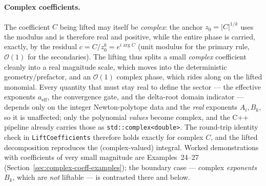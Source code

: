 \documentclass[11pt,a4paper]{article}
\begin{document}
\paragraph{Complex coefficients.} The coefficient $C$ being lifted may itself be \emph{complex}: the anchor $z_0 = |C|^{1/k}$ uses the modulus and is therefore real and positive, while the entire phase is carried, exactly, by the residual $c = C/z_0^{k} = e^{i\arg C}$ (unit modulus for the primary rule, $\mathcal{O}(1)$ for the secondaries). The lifting thus splits a small \emph{complex} coefficient cleanly into a real magnitude scale, which moves into the deterministic geometry/prefactor, and an $\mathcal{O}(1)$ complex phase, which rides along on the lifted monomial. Every quantity that must stay real to define the sector --- the effective exponents $a_{\mathrm{eff}}$, the convergence gate, and the delta-root domain indicator --- depends only on the integer Newton-polytope data and the \emph{real} exponents $A_i, B_k$, so it is unaffected; only the polynomial \emph{values} become complex, and the C++ pipeline already carries those as \texttt{std::complex<double>}. The round-trip identity check in \texttt{LiftCoefficients} therefore holds exactly for complex $C$, and the lifted decomposition reproduces the (complex-valued) integral. Worked demonstrations with coefficients of very small magnitude are Examples~24--27 (Section~\ref{sec:complex-coeff-examples}); the boundary case --- complex \emph{exponents} $B_k$, which are \emph{not} liftable --- is contrasted there and below.
\end{document}
